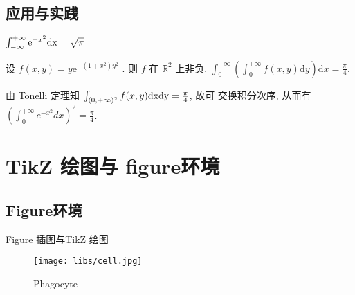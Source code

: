 \documentclass{libs/ccnu_format}
\begin{document}
\subsection{应用与实践}
\begin{frame}{}

 \begin{tcolorbox}[title=\textbf{例 3 (Gaussian 积分)},colback=violet!60!blue!10,colframe=Deepblue!55!wine!100!]
 $\int_{-\infty}^{+\infty} \mathrm{e}^{-x^{2}} \rm{d} x=\sqrt{\pi}$
 \end{tcolorbox}

 \begin{tcolorbox}
   [colback=gray!10,colframe=Orange!40!blue!60!black,title=\textbf{证明}]
   设  $f(x, y)=y \mathrm{e}^{-\left(1+x^{2}\right) y^{2}}$ .  则  $f$  在  $\mathbb{R}^{2}$  上非负. $\int_{0}^{+\infty}\left(\int_{0}^{+\infty} f(x, y) \mathrm{d} y\right) \mathrm{d} x=\frac{\pi}{4}$.

   \end{tcolorbox}

 \begin{tcolorbox}
     [title = \textbf{续证}, colback=pink!20, colframe=green!40!yellow!50!violet]
     由 Tonelli 定理知  $\int_{(0,+\infty)^{2}} f(x, y) \rm{d} x \rm{d} y=\frac{\pi}{4}$,  故可
交换积分次序, 从而有
$\left(\int_{0}^{+\infty} e^{-x^{2}} d x\right)^{2}=\frac{\pi}{4}$.
     \end{tcolorbox}

\end{frame}

\section{TikZ 绘图与 figure环境}
\subsection{Figure环境}
\begin{frame}{Figure 插图与TikZ 绘图}

\begin{figure}
        \centering
        \texttt{[image: libs/cell.jpg]}

        \caption{Phagocyte}

        \label{fig:ufc_emblem}
    \end{figure}


\end{frame}
\end{document}
